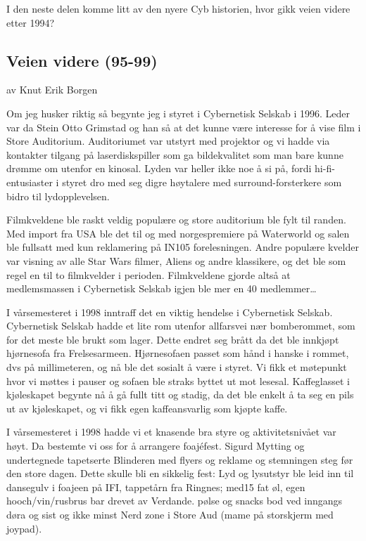 \documentclass[../main.tex]{subfiles}
\begin{document}
I den neste delen komme litt av den nyere Cyb historien, hvor gikk veien videre etter 1994?

\subsection{Veien videre (95-99)}
av Knut Erik Borgen

Om jeg husker riktig så begynte jeg i styret i Cybernetisk Selskab i 1996. Leder var da Stein Otto Grimstad og han så at det kunne være interesse for å vise film i Store Auditorium. Auditoriumet var utstyrt med projektor og vi hadde via kontakter tilgang på laserdiskspiller som ga bildekvalitet som man bare kunne drømme om utenfor en kinosal. Lyden var heller ikke noe å si på, fordi hi-fi-entusiaster i styret dro med seg digre høytalere med surround-forsterkere som bidro til lydopplevelsen.

Filmkveldene ble raskt veldig populære og store auditorium ble fylt til randen. Med import fra USA ble det til og med norgespremiere på Waterworld og salen ble fullsatt med kun reklamering på IN105 forelesningen. Andre populære kvelder var visning av alle Star Wars filmer, Aliens og andre klassikere, og det ble som regel en til to filmkvelder i perioden. Filmkveldene gjorde altså at medlemsmassen i Cybernetisk Selskab igjen ble mer en 40 medlemmer…

I vårsemesteret i 1998 inntraff det en viktig hendelse i Cybernetisk Selskab. Cybernetisk Selskab hadde et lite rom utenfor allfarsvei nær bomberommet, som for det meste ble brukt som lager. Dette endret seg brått da det ble innkjøpt hjørnesofa fra Frelsesarmeen. Hjørnesofaen passet som hånd i hanske i rommet, dvs på millimeteren, og nå ble det sosialt å være i styret. Vi fikk et møtepunkt hvor vi møttes i pauser og sofaen ble straks byttet ut mot lesesal.  Kaffeglasset i kjøleskapet begynte nå å gå fullt titt og stadig, da det ble enkelt å ta seg en pils ut av kjøleskapet, og vi fikk egen kaffeansvarlig som kjøpte kaffe.

I vårsemesteret i 1998 hadde vi et knasende bra styre og aktivitetsnivået var høyt. Da bestemte vi oss for å arrangere foajéfest. Sigurd Mytting og undertegnede tapetserte Blinderen med flyers og reklame og stemningen steg før den store dagen. Dette skulle bli en sikkelig fest:
Lyd og lysutstyr ble leid inn til dansegulv i foajeen på IFI, tappetårn fra Ringnes; med15 fat øl, egen hooch/vin/rusbrus bar drevet av Verdande. pølse og snacks bod ved inngangs døra og sist og ikke minst Nerd zone i Store Aud (mame på storskjerm med joypad).
\end{document}
